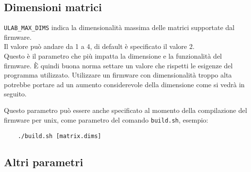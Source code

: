 \documentclass[12pt,a4paper]{report}
\begin{document}
\subsection{Dimensioni matrici}\label{dimensioni-matrici}

\texttt{ULAB\_MAX\_DIMS} indica la dimensionalità massima delle matrici
supportate dal firmware.\\
Il valore può andare da 1 a 4, di default è specificato il valore 2.\\
Questo è il parametro che più impatta la dimensione e la funzionalità
del firmware. È quindi buona norma settare un valore che rispetti le
esigenze del programma utilizzato. Utilizzare un firmware con
dimensionalità troppo alta potrebbe portare ad un aumento considerevole
della dimensione come si vedrà in seguito.

Questo parametro può essere anche specificato al momento della
compilazione del firmware per unix, come parametro del comando
\texttt{build.sh}, esempio:

\begin{verbatim}
    ./build.sh [matrix.dims]
\end{verbatim}

\subsection{Altri parametri}\label{altri-parametri}
\end{document}
